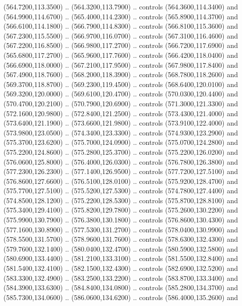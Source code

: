 {\begin{scope}[y=0.80pt, x=0.80pt, yscale=-1, xscale=1, inner sep=0pt, outer sep=0pt, #1]
      (564.7200,113.3500) .. (564.3200,113.7900) .. controls (564.3600,114.3400) and
      (564.9900,114.6700) .. (565.4000,114.2300) .. controls (565.8900,114.3700) and
      (566.6100,114.1800) .. (566.7900,114.8300) .. controls (566.8100,115.3600) and
      (567.2300,115.5500) .. (566.9700,116.0700) .. controls (567.3100,116.4600) and
      (567.2200,116.8500) .. (566.9800,117.2700) .. controls (566.7200,117.6900) and
      (565.6800,117.2700) .. (565.9600,117.7600) .. controls (566.4200,118.0400) and
      (566.6900,118.0000) .. (567.2100,117.9500) .. controls (567.9800,117.8400) and
      (567.4900,118.7600) .. (568.2000,118.3900) .. controls (568.7800,118.2600) and
      (569.3700,118.8700) .. (569.2300,119.4500) .. controls (568.6400,120.0100) and
      (569.3200,120.0000) .. (569.6100,120.4700) .. controls (570.0300,120.4400) and
      (570.4700,120.2100) .. (570.7900,120.6900) .. controls (571.3000,121.3300) and
      (572.1600,120.9800) .. (572.8400,121.2500) .. controls (573.4300,121.4000) and
      (573.6400,121.1900) .. (573.6600,121.9800) .. controls (573.9100,122.4000) and
      (573.9800,123.0500) .. (574.3400,123.3300) .. controls (574.9300,123.2900) and
      (575.3700,123.6200) .. (575.7000,124.0900) .. controls (575.0700,124.2800) and
      (575.2200,124.8600) .. (575.2800,125.3700) .. controls (575.2200,126.0200) and
      (576.0600,125.8000) .. (576.4000,126.0300) .. controls (576.7800,126.3800) and
      (577.2300,126.2300) .. (577.1400,126.9500) .. controls (577.7200,127.5100) and
      (576.8600,127.6600) .. (576.5100,128.0100) .. controls (575.9200,128.4700) and
      (575.7700,127.5100) .. (575.5200,127.5300) .. controls (574.7800,127.4400) and
      (574.8500,128.1200) .. (575.2200,128.5300) .. controls (575.8700,128.8100) and
      (575.3400,129.4100) .. (575.8200,129.7800) .. controls (575.2600,130.2200) and
      (575.9900,130.7900) .. (576.3800,130.1800) .. controls (576.8600,130.4300) and
      (577.1600,130.8900) .. (577.5300,131.2700) .. controls (578.0400,130.9900) and
      (578.5500,131.5700) .. (578.9600,131.7600) .. controls (578.6300,132.4300) and
      (579.7600,132.1400) .. (580.0400,132.4700) .. controls (580.5900,132.5800) and
      (580.6900,133.4400) .. (581.2100,133.3100) .. controls (581.5500,132.8400) and
      (581.5400,132.4100) .. (582.1500,132.4300) .. controls (582.6900,132.5200) and
      (583.3300,132.4900) .. (583.2500,133.2200) .. controls (583.8700,133.3400) and
      (584.3900,133.6300) .. (584.8400,134.0800) .. controls (585.2800,134.3700) and
      (585.7300,134.0600) .. (586.0600,134.6200) .. controls (586.4000,135.2600) and

\end{scope}}
